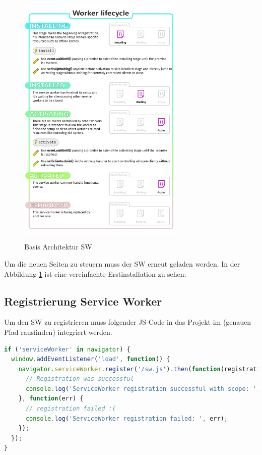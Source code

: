 \begin{figure}[h]
	\centering
	\includegraphics[width=8cm]{BilderAllgemein/swLifecycle}\medskip
	\caption{Basis Architektur \acl{SW}}
	\label{fig:Erstinstallation}\cite{ServiceWorkerArchitecture}
\end{figure}
Um die neuen Seiten zu steuern muss der \acs{SW} erneut geladen werden.
In der Abbildung \ref{fig:Erstinstallation} ist eine vereinfachte Erstinstallation zu sehen:

\subsection{Registrierung Service Worker}

Um den \acs{SW} zu registrieren muss folgender \acs{JS}-Code in das Projekt im (genauen Pfad rausfinden) integriert werden.
\begin{lstlisting}[language=JavaScript, caption={Service Worker Register},label=lst:ServiceWorkerRegister, xleftmargin=50pt]
if ('serviceWorker' in navigator) {
  window.addEventListener('load', function() {
    navigator.serviceWorker.register('/sw.js').then(function(registration) {
      // Registration was successful
      console.log('ServiceWorker registration successful with scope: ', registration.scope);
    }, function(err) {
      // registration failed :(
      console.log('ServiceWorker registration failed: ', err);
    });
  });
}
\end{lstlisting}

